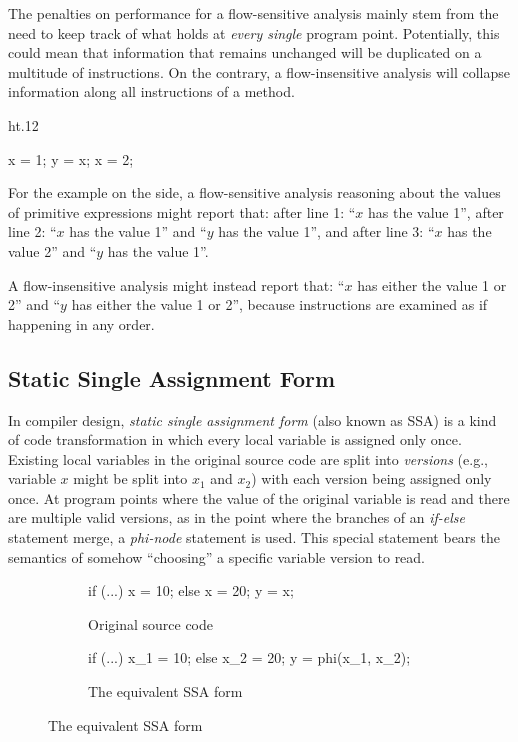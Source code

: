 The penalties on performance for a flow-sensitive analysis mainly stem from the need to keep track of what holds at \emph{every single} program point. Potentially, this could mean that information that remains unchanged will be duplicated on a multitude of instructions. On the contrary, a flow-insensitive analysis will collapse information along all instructions of a method.

{
\setlength\intextsep{-10pt}
\begin{wrapfigure}{ht}{.12\textwidth}
\centering
\begin{javacodeLines}
x = 1;
y = x;
x = 2;
\end{javacodeLines}
\end{wrapfigure}

For the example on the side, a flow-sensitive analysis reasoning about the values of primitive expressions might report that:
after line 1: ``$x$ has the value 1'',
after line 2: ``$x$ has the value 1'' and ``$y$ has the value 1'', and
after line 3: ``$x$ has the value 2'' and ``$y$ has the value 1''.

A flow-insensitive analysis might instead report that:
``$x$ has either the value 1 or 2'' and ``$y$ has either the value 1 or 2'',
because instructions are examined as if happening in any order.
}

\subsection{Static Single Assignment Form}

In compiler design, \emph{static single assignment form} (also known as SSA) is a kind of code transformation in which every local variable is assigned only once. Existing local variables in the original source code are split into \emph{versions} (e.g., variable $x$ might be split into $x_1$ and $x_2$) with each version being assigned only once. At program points where the value of the original variable is read and there are multiple valid versions, as in the point where the branches of an \emph{if-else} statement merge, a \emph{phi-node} statement is used. This special statement bears the semantics of somehow ``choosing'' a specific variable version to read.

\begin{figure}[h]
\begin{subfigure}{.45\textwidth}
\begin{javacodeLines}
if (...) x = 10;
else x = 20;
y = x;
\end{javacodeLines}
\caption{Original source code}
\end{subfigure}%
    \hfill
\begin{subfigure}{.45\textwidth}
\begin{javacodeLines}
if (...) x_1 = 10;
else x_2 = 20;
y = phi(x_1, x_2);
\end{javacodeLines}
\caption{The equivalent SSA form}
\end{subfigure}
\end{figure}

